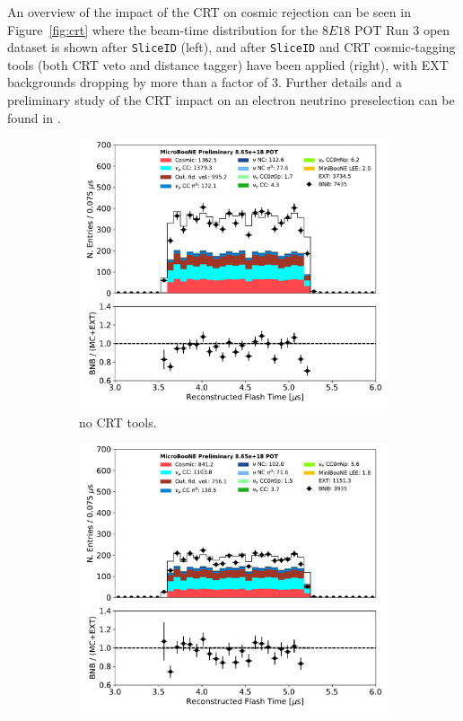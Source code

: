 An overview of the impact of the CRT on cosmic rejection can be seen in Figure~\ref{fig:crt} where the beam-time distribution for the $8E18$ POT Run 3 open dataset is shown after \texttt{SliceID} (left), and after \texttt{SliceID} and CRT cosmic-tagging tools (both CRT veto and distance tagger) have been applied (right), with EXT backgrounds dropping by more than a factor of 3.
Further details and a preliminary study of the CRT  impact on an electron neutrino preselection can be found in \cite{bib:CRTPresel_Technote}. 

\begin{figure}[ht] 
\begin{center}
    \begin{subfigure}[b]{0.4\textwidth}
    \centering
    \includegraphics[width=1.00\textwidth]{NuId-Ch2/Images/flash_time_01152020.pdf}
    \caption{\label{fig:crt:pre} no CRT tools.}
    \end{subfigure}
    \begin{subfigure}[b]{0.4\textwidth}
    \centering
    \includegraphics[width=1.00\textwidth]{NuId-Ch2/Images/flash_time_01152020_CRT.pdf}

\end{subfigure}
\end{center}
\end{figure}
